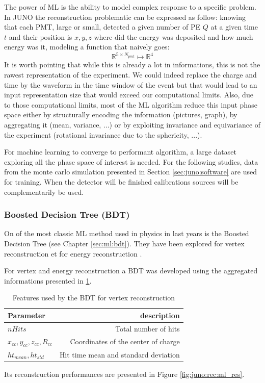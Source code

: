 \documentclass[../main.tex]{subfiles}
\begin{document}
The power of ML is the ability to model complex response to a specific problem. In JUNO the reconstruction problematic can be expressed as follow: knowing that each PMT, large or small, detected a given number of PE $Q$ at a given time $t$ and their position is $x,y,z$ where did the energy was deposited and how much energy was it, modeling a function that naively goes:
\begin{equation}
    \mathbb{R}^{5 \times N_{pmt}} \longmapsto \mathbb{R}^4
\end{equation}
It is worth pointing that while this is already a lot in informations, this is not the rawest representation of the experiment. We could indeed replace the charge and time by the waveform in the time window of the event but that would lead to an input representation size that would exceed our computational limits. Also, due to those computational limits, most of the ML algorithm reduce this input phase space either by structurally encoding the information (pictures, graph), by aggregating it (mean, variance, ...) or by exploiting invariance and equivariance of the experiment (rotational invariance due to the sphericity, ...).

For machine learning to converge to performant algorithm, a large dataset exploring all the phase space of interest is needed. For the following studies, data from the monte carlo simulation presented in Section \ref{sec:juno:software} are used for training. When the detector will be finished calibrations sources will be complementarily be used.

\subsubsection{Boosted Decision Tree (BDT)}

On of the most classic ML method used in physics in last years is the Boosted Decision Tree (see Chapter \ref{sec:ml:bdt}). They have been explored for vertex reconstruction \cite{qian_vertex_2021} et for energy reconstruction \cite{qian_vertex_2021, gavrikov_energy_2022}.

For vertex and energy reconstruction a BDT was developed using the aggregated informations presented in \ref{tab:juno:rec:bdt_vertex}.

\begin{table}[ht]
  \centering
  \begin{tabular}{l|r}
    Parameter & description \\
    \hline
    $nHits$ & Total number of hits \\
    $x_{cc}, y_{cc}, z_{cc}, R_{cc}$ & Coordinates of the center of charge \\
    $ht_{mean}, ht_{std}$ & Hit time mean and standard deviation
  \end{tabular}
  \caption{Features used by the BDT for vertex reconstruction}
  \label{tab:juno:rec:bdt_vertex}
\end{table}
Its reconstruction performances are presented in Figure \ref{fig:juno:rec:ml_res}.
\end{document}
